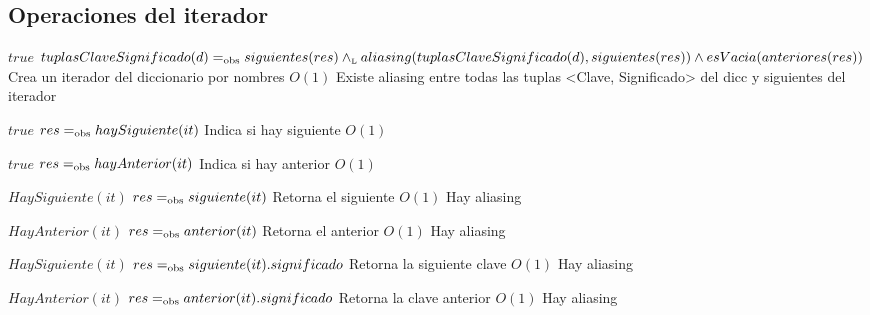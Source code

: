 


\subsection{Operaciones del iterador}
 {$true$}
 {$tuplasClaveSignificado(d) =_{\mathrm{obs}} siguientes(res) \land_{\mathrm{\scriptscriptstyle{L}}} aliasing(tuplasClaveSignificado(d),siguientes(res)) \land esVacia(anteriores(res))$}
 {Crea un iterador del diccionario por nombres}
 {$O(1)$}
 {Existe aliasing entre todas las tuplas <Clave, Significado> del dicc y siguientes del iterador}

 {$true$}
 {$res =_{\mathrm{obs}} haySiguiente(it)$}
 {Indica si hay siguiente}
 {$O(1)$}
 {}

 {$true$}
 {$res =_{\mathrm{obs}} hayAnterior(it)$}
 {Indica si hay anterior}
 {$O(1)$}
 {}

 {$HaySiguiente(it)$}
 {$res =_{\mathrm{obs}} siguiente(it)$}
 {Retorna el siguiente}
 {$O(1)$}
 {Hay aliasing}

 {$HayAnterior(it)$}
 {$res =_{\mathrm{obs}} anterior(it)$}
 {Retorna el anterior}
 {$O(1)$}
 {Hay aliasing}

 {$HaySiguiente(it)$}
 {$res =_{\mathrm{obs}} siguiente(it).significado$}
 {Retorna la siguiente clave}
 {$O(1)$}
 {Hay aliasing}

 {$HayAnterior(it)$}
 {$res =_{\mathrm{obs}} anterior(it).significado$}
 {Retorna la clave anterior}
 {$O(1)$}
 {Hay aliasing}

